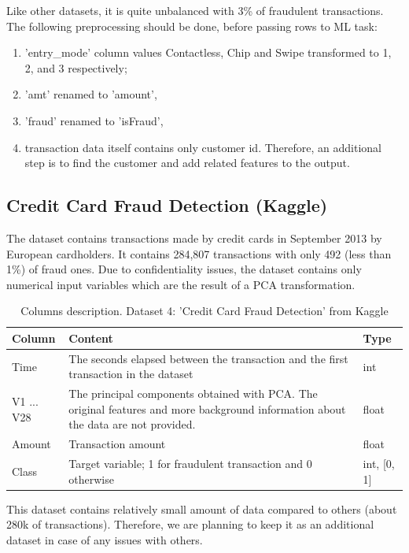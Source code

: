 \documentclass[12pt,a4paper, hidelinks]{article}
\begin{document}
Like other datasets, it is quite unbalanced with 3\% of fraudulent transactions. The following preprocessing should be done, before passing rows to ML task:
\begin{enumerate}
    \item 'entry\_mode' column values Contactless, Chip and Swipe transformed to 1, 2, and 3 respectively;
    \item 'amt' renamed to 'amount',
    \item 'fraud' renamed to 'isFraud',
    \item transaction data itself contains only customer id. Therefore, an additional step is to find the customer and add related features to the output.
\end{enumerate}

\newpage

\subsection{Credit Card Fraud Detection (Kaggle)}

The dataset contains transactions made by credit cards in September 2013 by European cardholders. It contains 284,807 transactions with only 492 (less than 1\%) of fraud ones. Due to confidentiality issues, the dataset contains only numerical input variables which are the result of a PCA transformation.

\begin{table}[ht!]
    \centering
    \begin{tabular}{|p{5.5cm}|p{8cm}|p{2cm}|}
    \hline
    \textbf{Column} & \textbf{Content} & \textbf{Type} \\
    \hline
    Time & The seconds elapsed between the transaction and the first transaction in the dataset & int \\
    \hline
    V1 ... V28 & The principal components obtained with PCA. The original features and more background information about the data are not provided. & float \\
    \hline
    Amount & Transaction amount & float \\
    \hline
    Class & Target variable; 1 for fraudulent transaction and 0 otherwise & int, [0, 1] \\
    \hline
    \end{tabular}
    \caption{Columns description. Dataset 4: 'Credit Card Fraud Detection' from Kaggle}
\end{table}

This dataset contains relatively small amount of data compared to others (about 280k of transactions). Therefore, we are planning to keep it as an additional dataset in case of any issues with others.
\end{document}
